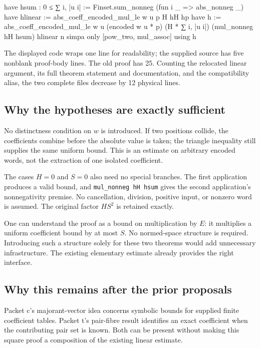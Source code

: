 \documentclass[11pt]{article}
\newcommand{\code}[1]{\ifmmode\text{\ttfamily\detokenize{#1}}\else\nolinkurl{#1}\fi}
\begin{document}
\begin{LeanCode}
  have hsum : 0 ≤ ∑ i, |u i| :=
    Finset.sum_nonneg (fun i _ => abs_nonneg _)
  have hlinear := abs_coeff_encoded_mul_le w u p H hH hp
  have h := abs_coeff_encoded_mul_le w u (encoded w u * p)
    (H * ∑ i, |u i|) (mul_nonneg hH hsum) hlinear n
  simpa only [pow_two, mul_assoc] using h
\end{LeanCode}

The displayed code wraps one line for readability; the supplied source has five
nonblank proof-body lines. The old proof has 25. Counting the relocated linear
argument, its full theorem statement and documentation, and the compatibility alias,
the two complete files decrease by 12 physical lines.

\subsection{Why the hypotheses are exactly sufficient}

No distinctness condition on \(w\) is introduced. If two positions collide, the
coefficients combine before the absolute value is taken; the triangle inequality
still supplies the same uniform bound. This is an estimate on arbitrary encoded
words, not the extraction of one isolated coefficient.

The cases \(H=0\) and \(S=0\) also need no special branches. The first application
produces a valid bound, and \code{mul_nonneg hH hsum} gives the second application's
nonnegativity premise. No cancellation, division, positive input, or nonzero word is
assumed. The original factor \(HS^2\) is retained exactly.

One can understand the proof as a bound on multiplication by \(E\): it multiplies a
uniform coefficient bound by at most \(S\). No normed-space structure is required.
Introducing such a structure solely for these two theorems would add unnecessary
infrastructure. The existing elementary estimate already provides the right interface.

\subsection{Why this remains after the prior proposals}

Packet c's majorant-vector idea concerns symbolic bounds for supplied finite
coefficient tables. Packet t's pair-fibre result identifies an exact coefficient
when the contributing pair set is known. Both can be present without making this
square proof a composition of the existing linear estimate.
\end{document}
